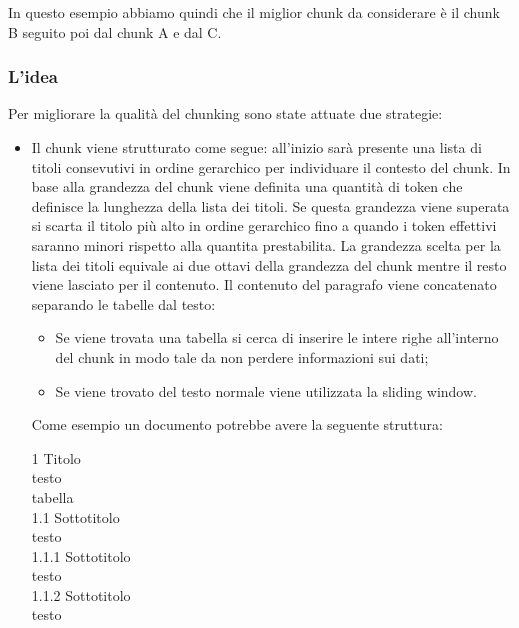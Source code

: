 \noindent In questo esempio abbiamo quindi che il miglior chunk da considerare è il chunk B seguito poi dal chunk A e dal C.

\subsubsection{L'idea}

Per migliorare la qualità del chunking sono state attuate due strategie:
\begin{itemize}
    \item Il chunk viene strutturato come segue: all'inizio sarà presente una lista di titoli consevutivi in ordine gerarchico per individuare il contesto del chunk. In base alla grandezza del chunk viene definita una quantità di token che definisce la lunghezza della lista dei titoli. Se questa grandezza viene superata si scarta il titolo più alto in ordine gerarchico fino a quando i token effettivi saranno minori rispetto alla quantita prestabilita.
    La grandezza scelta per la lista dei titoli equivale ai due ottavi della grandezza del chunk mentre il resto viene lasciato per il contenuto.
    \noindent Il contenuto del paragrafo viene concatenato separando le tabelle dal testo:
    \begin{itemize}
        \item Se viene trovata una tabella si cerca di inserire le intere righe all'interno del chunk in modo tale da non perdere informazioni sui dati;
        \item Se viene trovato del testo normale viene utilizzata la sliding window.
    \end{itemize}

    Come esempio un documento potrebbe avere la seguente struttura:
    \begin{tcolorbox}[colback=white, colframe=black]
        1 Titolo\\
        testo\\
        tabella\\
        1.1 Sottotitolo\\
        testo\\
        1.1.1 Sottotitolo\\
        testo\\
        1.1.2 Sottotitolo\\
        testo\\
    \end{tcolorbox}


\end{itemize}
